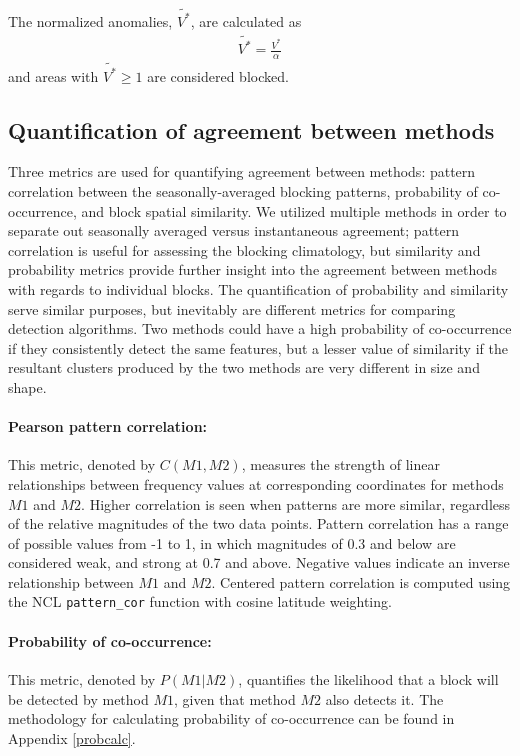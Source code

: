 \documentclass[smallextended]{svjour3}       %
\numberwithin{equation}{section}
\begin{document}
The normalized anomalies, $\widetilde{V^*}$, are calculated as
 \begin{eqnarray}
 \widetilde{V^*} = \frac{V^*}{\alpha}
 \end{eqnarray}
\noindent 
and areas with $\widetilde{V^*}\geq 1$ are considered blocked.

\subsection{Quantification of agreement between methods}\label{simsec}

Three metrics are used for quantifying agreement between methods: 
pattern correlation between the seasonally-averaged blocking patterns, probability of co-occurrence, and block spatial similarity.  We utilized multiple methods in order to separate out seasonally averaged versus instantaneous agreement; pattern correlation is useful for assessing the blocking climatology, but similarity and probability metrics provide further insight into the agreement between methods with regards to individual blocks. The quantification of probability and similarity serve similar purposes, but inevitably are different metrics for comparing detection algorithms. Two methods could have a high probability of co-occurrence if they consistently detect the same features, but a lesser value of similarity if the resultant clusters produced by the two methods are very different in size and shape.

\paragraph{Pearson pattern correlation:} This metric, denoted by $C(M1,M2)$, measures the strength of linear relationships between  frequency values at corresponding coordinates for methods $M1$ and $M2$. Higher correlation is seen when patterns are more similar, regardless of the relative magnitudes of the two data points.{ \color{blue}Pattern correlation has a range of possible values from -1 to 1, in which magnitudes of 0.3 and below are considered weak, and strong at 0.7 and above. Negative values indicate an inverse relationship between $M1$ and $M2$.} Centered pattern correlation is computed using the NCL \texttt{pattern\_cor} function with cosine latitude weighting. 

\paragraph{Probability of co-occurrence:} This metric, denoted by $P(M1|M2)$, quantifies the likelihood that a block will be detected by method $M1$, given that method $M2$ also detects it. The methodology for calculating probability of co-occurrence can be found in Appendix \ref{probcalc}. 
\end{document}
